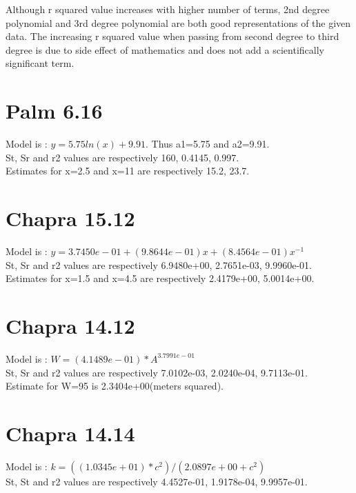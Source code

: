 \documentclass{article}
\begin{document}
Although r squared value increases with higher number of terms, 2nd degree polynomial and 3rd degree polynomial are both good representations of the given data. The increasing r squared value when passing from second degree to third degree is due to side effect of mathematics and does not add a scientifically significant term.

\section{Palm 6.16}
Model is : $y=5.75ln(x)+9.91$. Thus a1=5.75 and a2=9.91. \\
St, Sr and r2 values are respectively 160, 0.4145, 0.997. \\
Estimates for x=2.5 and x=11 are respectively 15.2, 23.7. \\
\section{Chapra 15.12}
Model is :  $y= 3.7450e-01 + (9.8644e-01)x + (8.4564e-01)x^{-1}$ \\
St, Sr and r2 values are respectively 6.9480e+00, 2.7651e-03, 9.9960e-01. \\
Estimates for x=1.5 and x=4.5 are respectively 2.4179e+00, 5.0014e+00. \\

\section{Chapra 14.12}
Model is : $W=(4.1489e-01)*A^{3.7991e-01}$ \\
St, Sr and r2 values are respectively 7.0102e-03, 2.0240e-04, 9.7113e-01. \\
Estimate for W=95 is 2.3404e+00(meters squared).\\

\section{Chapra 14.14}
Model is : $k=((1.0345e+01)*c^2)/(2.0897e+00+c^2)$ \\
St, St and r2 values are respectively 4.4527e-01, 1.9178e-04, 9.9957e-01. \\
\end{document}
